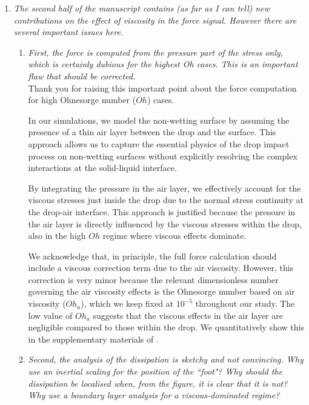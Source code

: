 \documentclass[]{article}
\begin{document}
\begin{enumerate}
	\item \textit{The second half of the manuscript contains (as far as I can tell) new contributions on the effect of viscosity in the force signal. However there are several important issues here. }
	
	\begin{enumerate}
		\item \textit{First, the force is computed from the pressure part of the stress only, which is certainly dubious for the highest Oh cases. This is an important flaw that should be corrected.}\\[0.5mm]
		
		Thank you for raising this important point about the force computation for high Ohnesorge number ($Oh$) cases. 
		
		In our simulations, we model the non-wetting surface by assuming the presence of a thin air layer between the drop and the surface. This approach allows us to capture the essential physics of the drop impact process on non-wetting surfaces without explicitly resolving the complex interactions at the solid-liquid interface.
		
		By integrating the pressure in the air layer, we effectively account for the viscous stresses just inside the drop due to the normal stress continuity at the drop-air interface. This approach is justified because the pressure in the air layer is directly influenced by the viscous stresses within the drop, also in the high $Oh$ regime where viscous effects dominate.
		
		We acknowledge that, in principle, the full force calculation should include a viscous correction term due to the air viscosity. However, this correction is very minor because the relevant dimensionless number governing the air viscosity effects is the Ohnesorge number based on air viscosity ($Oh_a$), which we keep fixed at $10^{-5}$ throughout our study. The low value of $Oh_a$ suggests that the viscous effects in the air layer are negligible compared to those within the drop. We quantitatively show this in the supplementary materials of \citet{zhang2022impact}.
		
		\item \textit{Second, the analysis of the dissipation is sketchy and not convincing. Why use an inertial scaling for the position of the ``foot"? Why should the dissipation be localised when, from the figure, it is clear that it is not? Why use a boundary layer analysis for a viscous-dominated regime?}\\[0.5mm]
		

\end{enumerate}
\end{enumerate}
\end{document}
